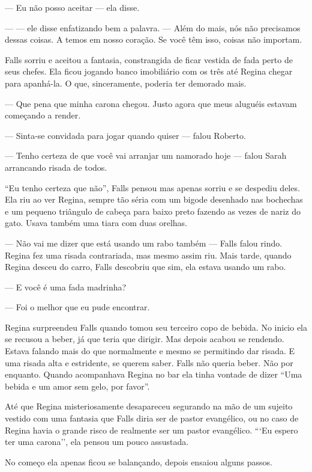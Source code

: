 --- Eu não posso aceitar --- ela disse.

---  --- ele disse\mudanca{,} enfatizando bem a palavra. --- Além do mais, nós não precisamos dessas coisas. A temos em nosso coração. Se você têm isso, coisas não importam.

Falls sorriu e aceitou a fantasia, constrangida de ficar vestida de fada perto de seus chefes. Ela ficou jogando banco imobiliário com os três até Regina chegar para apanhá-la. O que, sinceramente, poderia ter demorado mais.

--- Que pena que minha carona chegou. Justo agora que meus aluguéis estavam começando a render.

--- Sinta-se convidada para jogar quando quiser --- falou Roberto.

--- Tenho certeza de que você vai arranjar um namorado hoje --- falou Sarah\mudanca{,} arrancando risada de todos.

``Eu tenho certeza que não'', Falls pensou mas apenas sorriu e se despediu deles. Ela riu ao ver Regina, sempre tão séria\mudanca{,} com um bigode desenhado nas bochechas e um pequeno triângulo de cabeça para baixo preto fazendo as vezes de nariz do gato. Usava também uma tiara com duas orelhas.

--- Não vai me dizer que está usando um rabo também --- Falls falou rindo. Regina fez uma risada contrariada, mas mesmo assim riu. Mais tarde, quando Regina desceu do carro, Falls descobriu que sim, ela estava usando um rabo.

--- E você é uma fada madrinha?

--- Foi o melhor que eu pude encontrar.

Regina surpreendeu Falls quando tomou seu terceiro copo de bebida. No inicio ela se recusou a beber, já que teria que dirigir. Mas depois acabou se rendendo. Estava falando mais do que normalmente e mesmo se permitindo dar risada. E uma risada alta e estridente, se querem saber. Falls não queria beber. Não por enquanto. Quando acompanhava Regina no bar ela tinha vontade de dizer ``Uma bebida e um amor sem gelo, por favor''.

Até que Regina misteriosamente desapareceu segurando na mão de um sujeito vestido com uma fantasia que Falls diria ser de pastor evangélico, ou no caso de Regina havia o grande risco de realmente ser um pastor evangélico. ```Eu espero ter uma carona'', ela pensou um pouco assustada.

No começo ela apenas ficou se balançando, depois ensaiou alguns passos.

